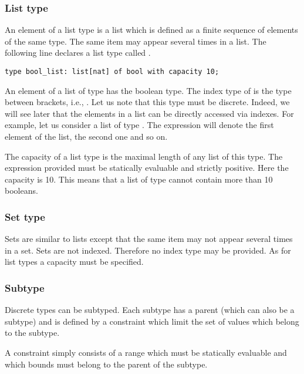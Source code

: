 \subsubsection{List type}
An element of a list type is a list which is defined as a finite
sequence of elements of the same type.  The same item may appear
several times in a list.  The following line declares a list type
called .
\begin{lstlisting}
type bool_list: list[nat] of bool with capacity 10;
\end{lstlisting}
An element of a list of type  has the boolean type.  The
index type of  is the type between brackets, i.e.,
.  Let us note that this type must be discrete.  Indeed, we
will see later that the elements in a list can be directly accessed
via indexes.  For example, let us consider a list  of type
.  The expression  will denote the first
element of the list,  the second one and so on.

The capacity of a list type is the maximal length of any list of this
type.  The expression provided must be statically evaluable and
strictly positive.  Here the capacity is 10.  This means that a list
of type  cannot contain more than 10 booleans.\\

\listtypedef


\subsubsection{Set type}
Sets are similar to lists except that the same item may not appear
several times in a set.  Sets are not indexed.  Therefore no index
type may be provided.  As for list types a capacity must be
specified.\\

\settypedef


\subsubsection{Subtype}
Discrete types can be subtyped.  Each subtype has a parent (which can
also be a subtype) and is defined by a constraint which limit the set
of values which belong to the subtype.

A constraint simply consists of a range which must be statically
evaluable and which bounds must belong to the parent of the subtype.

